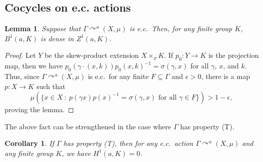 \documentclass[12pt]{amsart}
\newtheorem{lem}[thm]{Lemma}
\newtheorem{cor}[thm]{Corollary}
\theoremstyle{definition}
\newcommand{\acts}{\curvearrowright}
\begin{document}
\subsection{Cocycles on e.c. actions} \label{subs:ec_cocycles}

\begin{lem}\label{eccocycle}
Suppose that $\Gamma\acts^a(X,\mu)$ is e.c.\  Then, for any finite group $K$, $B^1(a,K)$ is dense in $Z^1(a,K)$.
\end{lem}

\begin{proof}
Let $Y$ be the skew-product extension $X\times_\sigma K$.  If $p_0:Y\to K$ is the projection map, then we have $p_0(\gamma\cdot (x,k))p_0(x,k)^{-1}=\sigma(\gamma,x)$ for all $\gamma$, $x$, and $k$.  Thus, since $\Gamma\acts^a(X,\mu)$ is e.c.\, for any finite $F\subseteq \Gamma$ and $\epsilon>0$, there is a map $p:X\to K$ such that $$\mu(\{x\in X \ : \ p(\gamma x)p(x)^{-1}=\sigma(\gamma,x) \text{ for all }\gamma\in F\})>1-\epsilon,$$ proving the lemma.
\end{proof}

The above fact can be strengthened in the case where $\Gamma$ has property (T).

\begin{cor}
If $\Gamma$ has property (T), then for any e.c.\ action $\Gamma\acts^a(X,\mu)$ and any finite group $K$, we have $H^1(a,K)=0$.
\end{cor}
\end{document}
